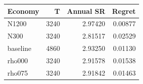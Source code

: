 \begin{tabular}{lrrr}
\toprule
Economy & T & Annual SR & Regret \\
\midrule
N1200 & 3240 & 2.97420 & 0.00877 \\
N300 & 3240 & 2.81517 & 0.02529 \\
baseline & 4860 & 2.93250 & 0.01130 \\
rho000 & 3240 & 2.91578 & 0.01538 \\
rho075 & 3240 & 2.91842 & 0.01463 \\
\bottomrule
\end{tabular}
